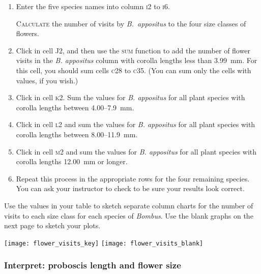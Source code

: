 \documentclass[12pt, hidelinks, twoside]{exam}
\begin{document}
\begin{questions}
\begin{enumerate}
	\item Enter the five species names into column \textsc{i}2 to \textsc{i}6.
	
	\textsc{Calculate} the number of visits by \textit{B.~appositus} to the four
	size classes of flowers. 
	
	\item Click in cell J2, and then use the \textsc{sum} function to add the
	number of flower visits in the \textit{B. appositus} column with corolla
	lengths less than 3.99~mm. For this cell, you should sum cells \textsc{c}28 to \textsc{c}35. 
	(You can sum only the cells with values, if you wish.)
	
	\item Click in cell \textsc{k}2. Sum the values for \textit{B. appositus} for
	all plant species with corolla lengths between 4.00–7.9~mm. 
	
	\item Click in cell \textsc{l}2 and sum the values for \textit{B. appositus} for
	all plant species with corolla lengths between 8.00–11.9~mm.
	
	\item Click in cell \textsc{m}2 and sum the values for \textit{B. appositus} for
	all plant species with corolla lengths 12.00~mm or longer.
	
	\item Repeat this process in the appropriate rows for the four remaining species. You can ask your instructor to check to be sure your results look correct. 
	
\end{enumerate}

\question
Use the values in your table to sketch separate column charts for the number
of visits to each size class for each species of \textit{Bombus}. Use the
blank graphs on the next page to sketch your plots.

\newpage

\ifprintanswers
	\texttt{[image: flower\_visits\_key]}
\else
	\texttt{[image: flower\_visits\_blank]}
\fi


\newpage





\subsubsection*{Interpret: proboscis length and flower size}


\end{questions}
\end{document}
